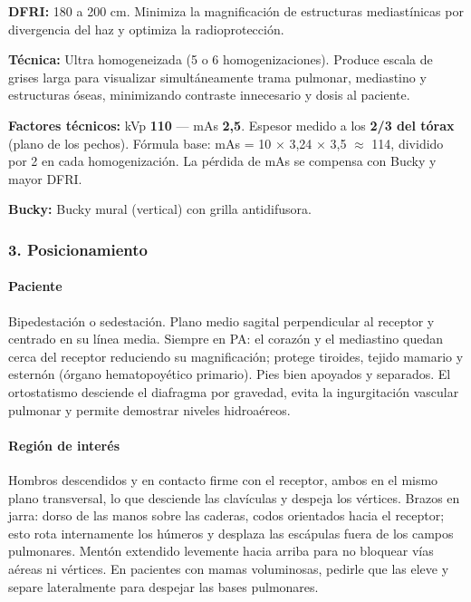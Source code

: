 \documentclass[9pt,a4paper,twocolumn,twoside]{tau-class/tau}
\begin{document}
	\textbf{DFRI:} 180 a 200 cm. Minimiza la magnificación de estructuras mediastínicas por divergencia del haz y optimiza la radioprotección.
	
	\textbf{Técnica:} Ultra homogeneizada (5 o 6 homogenizaciones). Produce escala de grises larga para visualizar simultáneamente trama pulmonar, mediastino y estructuras óseas, minimizando contraste innecesario y dosis al paciente.
	
	\textbf{Factores técnicos:} kVp \textbf{110} — mAs \textbf{2,5}. Espesor medido a los \textbf{2/3 del tórax} (plano de los pechos). Fórmula base: mAs = 10 × 3,24 × 3,5 $\approx$ 114, dividido por 2 en cada homogenización. La pérdida de mAs se compensa con Bucky y mayor DFRI.
	
	\textbf{Bucky:} Bucky mural (vertical) con grilla antidifusora.
	
	\subsubsection*{3. Posicionamiento}
	
	\paragraph{Paciente}
	Bipedestación o sedestación. Plano medio sagital perpendicular al receptor y centrado en su línea media. Siempre en PA: el corazón y el mediastino quedan cerca del receptor reduciendo su magnificación; protege tiroides, tejido mamario y esternón (órgano hematopoyético primario). Pies bien apoyados y separados. El ortostatismo desciende el diafragma por gravedad, evita la ingurgitación vascular pulmonar y permite demostrar niveles hidroaéreos.
	
	\paragraph{Región de interés}
	Hombros descendidos y en contacto firme con el receptor, ambos en el mismo plano transversal, lo que desciende las clavículas y despeja los vértices. Brazos en jarra: dorso de las manos sobre las caderas, codos orientados hacia el receptor; esto rota internamente los húmeros y desplaza las escápulas fuera de los campos pulmonares. Mentón extendido levemente hacia arriba para no bloquear vías aéreas ni vértices. En pacientes con mamas voluminosas, pedirle que las eleve y separe lateralmente para despejar las bases pulmonares.
	
\end{document}
